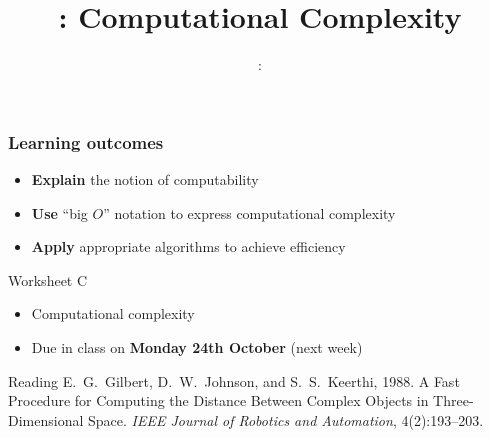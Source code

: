 \usepackage{../../beamerthemeFalmouthGamesAcademy}
\usepackage{multimedia}
\graphicspath{ {../../} }

\lstset{language=Python
}

\usepackage[normalem]{ulem}
\usepackage{wasysym}

\usepackage{algpseudocode}

\usepackage{pdfpages}

\usetikzlibrary{arrows,automata}




\title{\sessionnumber: Computational Complexity}
\subtitle{\modulecode: \moduletitle}

\frame{\titlepage} 

\begin{frame}
	\frametitle{Learning outcomes}
	\begin{itemize}
		\item \textbf{Explain} the notion of computability
		\item \textbf{Use} ``big $O$'' notation to express computational complexity
		\item \textbf{Apply} appropriate algorithms to achieve efficiency
	\end{itemize}
\end{frame}

\begin{frame}{Worksheet C}
	\begin{itemize}
		\item Computational complexity
		\item Due in class on \textbf{Monday 24th October} (next week)
	\end{itemize}
\end{frame}

\begin{frame}{Reading}
	E.\ G.\ Gilbert, D.\ W.\ Johnson, and S.\ S.\ Keerthi, 1988.
	A Fast Procedure for Computing the Distance Between Complex Objects in Three-Dimensional Space.
	\emph{IEEE Journal of Robotics and Automation},
	4(2):193--203.
\end{frame}









